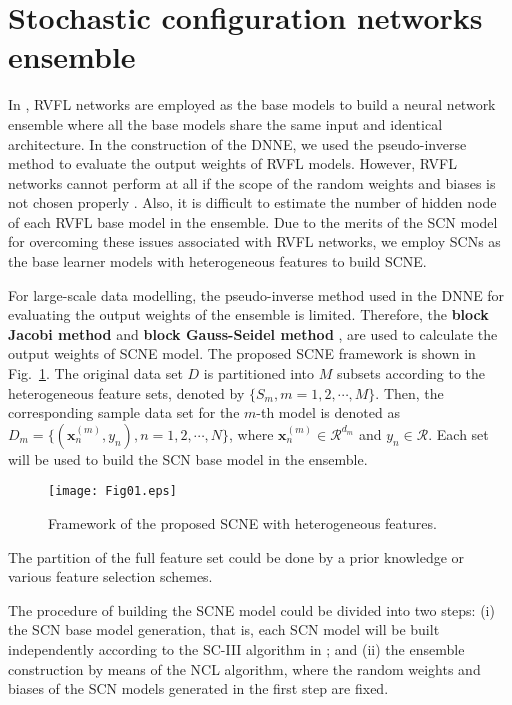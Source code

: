 \documentclass{article}
\begin{document}
\section{Stochastic configuration networks ensemble}
In \cite{alhamdoosh2014fast}, RVFL networks are employed as the base models to build a neural network ensemble where all the base models share the same input and identical architecture. 
In the construction of the DNNE, we used the pseudo-inverse method to evaluate the output weights of RVFL models.
However, RVFL networks cannot perform at all if the scope of the random weights and biases  is not chosen properly \cite{li2017insights, WangandLi_SCN, WangandLi_RSCN}. 
Also, it is difficult to estimate the number of hidden node of each RVFL base model in the ensemble.
Due to the merits of the SCN model for overcoming these issues associated with RVFL networks, we employ SCNs as the base learner models with heterogeneous features to build SCNE.

For large-scale data modelling, the pseudo-inverse method used in the DNNE for evaluating the output weights of the ensemble is limited. 
Therefore, the \textbf{block Jacobi method} and \textbf{block Gauss-Seidel method} \cite{young1971Iterative}, are used to calculate the output weights of SCNE model. 
The proposed SCNE framework is shown in Fig.~\ref{Fig1_Ensemble}. 
The original data set $D$ is partitioned into $M$ subsets according to the heterogeneous feature sets, denoted by $\{S_m, m=1,2,\cdots,M\}$.  
Then, the corresponding sample data set for the $m$-th model is denoted as $D_m = \{ (\bm{x}_n^{(m)}, y_n), n=1,2,\cdots,N\}$, where $\bm{x}_n^{(m)} \in \mathcal{R}^{d_m}$ and $y_n\in \mathcal{R}$. 
Each set will be used to build the SCN base model in the ensemble.
\begin{figure}[t]
\centering
\texttt{[image: Fig01.eps]}
\caption{Framework of the proposed SCNE with heterogeneous features.}
\label{Fig1_Ensemble}
\end{figure}
The partition of the full feature set could be done by a prior knowledge or various feature selection schemes. 

The procedure of building the SCNE model could be divided into two steps:
(i) the SCN base model generation, that is, each SCN model will be built independently according to the SC-III algorithm in \cite{WangandLi_SCN}; and (ii) the ensemble construction by means of the NCL algorithm, where the random weights and biases of the SCN models generated in the first step are fixed.
\end{document}
